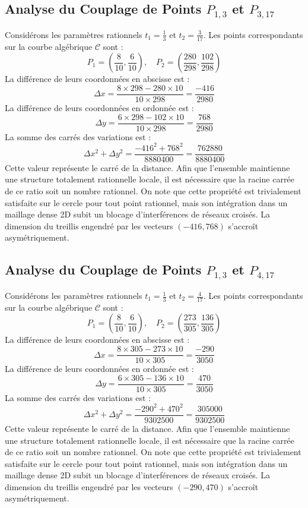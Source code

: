 \documentclass[12pt, a4paper]{article}
\begin{document}
\subsection{Analyse du Couplage de Points $P_{1,3}$ et $P_{3,17}$}
Considérons les paramètres rationnels $t_1 = \frac{1}{3}$ et $t_2 = \frac{3}{17}$.
Les points correspondants sur la courbe algébrique $\mathcal{C}$ sont :
$$ P_1 = \left( \frac{8}{10}, \frac{6}{10} \right), \quad P_2 = \left( \frac{280}{298}, \frac{102}{298} \right) $$
La différence de leurs coordonnées en abscisse est :
$$ \Delta x = \frac{8 \times 298 - 280 \times 10}{10 \times 298} = \frac{-416}{2980} $$
La différence de leurs coordonnées en ordonnée est :
$$ \Delta y = \frac{6 \times 298 - 102 \times 10}{10 \times 298} = \frac{768}{2980} $$
La somme des carrés des variations est :
$$ \Delta x^2 + \Delta y^2 = \frac{ -416^2 + 768^2 }{ 8880400 } = \frac{ 762880 }{ 8880400 } $$
Cette valeur représente le carré de la distance. Afin que l'ensemble maintienne une structure totalement rationnelle locale, il est nécessaire que la racine carrée de ce ratio soit un nombre rationnel. On note que cette propriété est trivialement satisfaite sur le cercle pour tout point rationnel, mais son intégration dans un maillage dense 2D subit un blocage d'interférences de réseaux croisés. La dimension du treillis engendré par les vecteurs $( -416, 768 )$ s'accroît asymétriquement.


\subsection{Analyse du Couplage de Points $P_{1,3}$ et $P_{4,17}$}
Considérons les paramètres rationnels $t_1 = \frac{1}{3}$ et $t_2 = \frac{4}{17}$.
Les points correspondants sur la courbe algébrique $\mathcal{C}$ sont :
$$ P_1 = \left( \frac{8}{10}, \frac{6}{10} \right), \quad P_2 = \left( \frac{273}{305}, \frac{136}{305} \right) $$
La différence de leurs coordonnées en abscisse est :
$$ \Delta x = \frac{8 \times 305 - 273 \times 10}{10 \times 305} = \frac{-290}{3050} $$
La différence de leurs coordonnées en ordonnée est :
$$ \Delta y = \frac{6 \times 305 - 136 \times 10}{10 \times 305} = \frac{470}{3050} $$
La somme des carrés des variations est :
$$ \Delta x^2 + \Delta y^2 = \frac{ -290^2 + 470^2 }{ 9302500 } = \frac{ 305000 }{ 9302500 } $$
Cette valeur représente le carré de la distance. Afin que l'ensemble maintienne une structure totalement rationnelle locale, il est nécessaire que la racine carrée de ce ratio soit un nombre rationnel. On note que cette propriété est trivialement satisfaite sur le cercle pour tout point rationnel, mais son intégration dans un maillage dense 2D subit un blocage d'interférences de réseaux croisés. La dimension du treillis engendré par les vecteurs $( -290, 470 )$ s'accroît asymétriquement.
\end{document}
